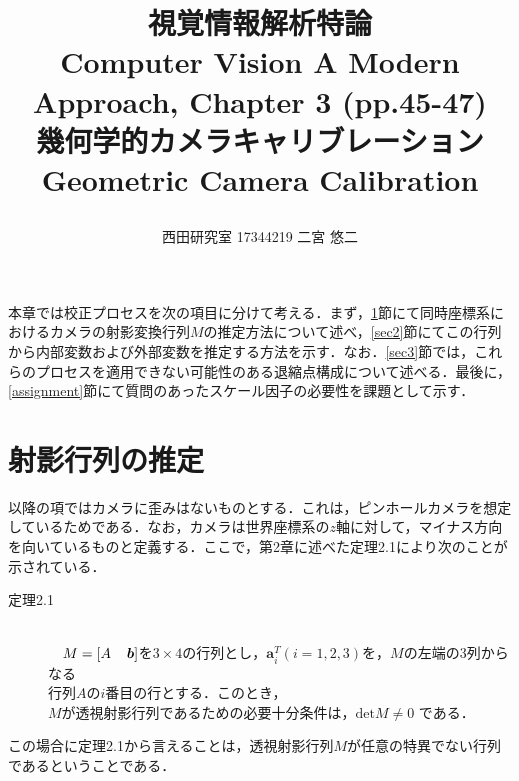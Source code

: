 \documentclass[a4paper,10pt]{jarticle}
\title{\vspace{-20truemm}
{\normalsize \rightline{平成29年\ 5月\ 17日}}  %
{\large 視覚情報解析特論\\} %
{\large Computer Vision A Modern Approach, Chapter 3 (pp.45-47)\\} %
幾何学的カメラキャリブレーション\\ %
{\large Geometric Camera Calibration\\}
\date{}
\vspace{-2truemm}}
\author{西田研究室 17344219 二宮 悠二} %
\begin{document}
\titlepage
\maketitle

本章では校正プロセスを次の項目に分けて考える．まず，\ref{sec1}節にて同時座標系におけるカメラの射影変換行列$ M $の推定方法について述べ，\ref{sec2}節にてこの行列から内部変数および外部変数を推定する方法を示す．なお．\ref{sec3}節では，これらのプロセスを適用できない可能性のある退縮点構成について述べる．最後に，\ref{assignment}節にて質問のあったスケール因子の必要性を課題として示す．


\section{射影行列の推定}
\label{sec1}
以降の項ではカメラに歪みはないものとする．これは，ピンホールカメラを想定しているためである．なお，カメラは世界座標系の$ z $軸に対して，マイナス方向を向いているものと定義する．ここで，第2章に述べた定理2.1により次のことが示されている．
%
\begin{description}
 \item[定理2.1]\mbox{}\\
　$ M = [A \hspace{4mm} {\bm b}] $を$ 3 \times 4 $の行列とし，$ {\bm a}^T_i (i = 1,2,3) $を，$ M $の左端の3列からなる\\
行列$ A $の$ i $番目の行とする．このとき，\\
\hspace{6mm}$ M $が透視射影行列であるための必要十分条件は，$ \mathrm{det}M \neq 0 $ である．
\end{description}
%
この場合に定理2.1から言えることは，透視射影行列$ M $が任意の特異でない行列であるということである．
\end{document}
